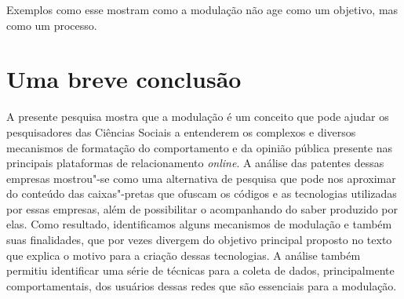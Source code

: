 Exemplos como esse mostram como a modulação não age como um objetivo,
mas como um processo.

\section{Uma breve conclusão}

\noindent{}A presente pesquisa mostra que a modulação é um conceito que pode ajudar
os pesquisadores das Ciências Sociais a entenderem os complexos e
diversos mecanismos de formatação do comportamento e da opinião pública
presente nas principais plataformas de relacionamento \emph{\emph{online}}. A análise
das patentes dessas empresas mostrou"-se como uma alternativa de pesquisa
que pode nos aproximar do conteúdo das caixas"-pretas que ofuscam os
códigos e as tecnologias utilizadas por essas empresas, além de
possibilitar o acompanhando do saber produzido por elas. Como resultado,
identificamos alguns mecanismos de modulação e também suas finalidades,
que por vezes divergem do objetivo principal proposto no texto que
explica o motivo para a criação dessas tecnologias. A análise também
permitiu identificar uma série de técnicas para a coleta de dados,
principalmente comportamentais, dos usuários dessas redes que são
essenciais para a modulação.

